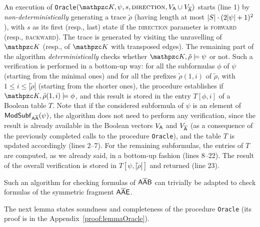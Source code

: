 An execution of \texttt{Oracle}$(\Ku,\psi,s,\textsc{direction},V_{\A}\cup V_{\Abar})$ starts (line 1) by \emph{non-determin\-istically} generating a trace $\tilde{\rho}$ (having length at most $|S|\cdot (2|\psi|+1)^2$), with $s$ as its first (resp., last) state if the \textsc{direction} parameter is \textsc{forward} (resp., \textsc{backward}). 
The trace is generated by visiting the unravelling of $\Ku$ (resp., of $\Ku$ with transposed edges). The remaining part of the algorithm \emph{deterministically} checks whether $\Ku,\tilde{\rho}\models\psi$ or not. 
Such a verification is performed in a bottom-up way: for all the subformulas $\phi$ of $\psi$ (starting from the minimal ones) and for all the prefixes $\tilde{\rho}(1,i)$ of $\tilde{\rho}$, with $1 \leq i \leq  |\tilde{\rho}|$ (starting from the shorter ones), the procedure establishes if $\Ku,\tilde{\rho}(1,i)\models\phi$, and this result is stored in the entry $T[\phi,i]$ of a Boolean table $T$. 
Note that if the considered subformula of $\psi$ is an element of $\mathsf{ModSubf}_{\mathsf{A\overline{A}}}(\psi)$, the algorithm does not need to perform any verification, since the result is already available in the Boolean vectors $V_{\mathsf{A}}$ and $V_{\mathsf{\overline{A}}}$ (as a consequence of the previously completed calls to the procedure \texttt{Oracle}), and the table $T$ is updated accordingly (lines 2--7).
For the remaining subformulas, the entries of $T$ are computed, as we already said, in a bottom-up fashion (lines 8--22). The result of the overall verification is stored 
in $T[\psi,|\tilde{\rho}|]$ and returned (line 23).

Such an algorithm 
for checking formulas of $\mathsf{A\overline{A}B}$ can trivially be adapted to check formulas of the symmetric fragment $\mathsf{A\overline{A}E}$.

The next lemma states soundness and completeness of the procedure \texttt{Oracle} (its proof is in the
Appendix~\ref{proof:lemmaOracle}).

